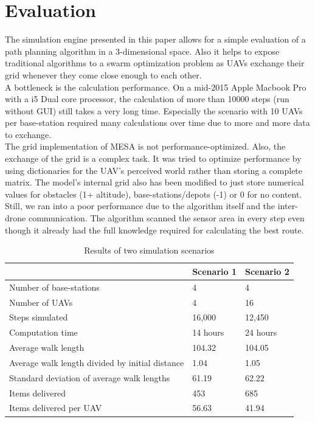 \section{Evaluation}\label{sec:evaluation}
The simulation engine presented in this paper allows for a simple evaluation of a path planning algorithm in a 3-dimensional space. Also it helps to expose traditional algorithms to a swarm optimization problem as UAVs exchange their grid whenever they come close enough to each other.\\
A bottleneck is the calculation performance. On a mid-2015 Apple Macbook Pro with a i5 Dual core processor, the calculation of more than 10000 steps (run without GUI) still takes a very long time. Especially the scenario with 10 UAVs per base-station required many calculations over time due to more and more data to exchange. \\
The grid implementation of MESA is not performance-optimized. Also, the exchange of the grid is a complex task. It was tried to optimize performance by using dictionaries for the UAV's perceived world rather than storing a complete matrix. The model's internal grid also has been modified to just store numerical values for obstacles (1+ altitude), base-stations/depots (-1) or 0 for no content.\\
Still, we ran into a poor performance due to the algorithm itself and the inter-drone communication. The algorithm scanned the sensor area in every step even though it already had the full knowledge required for calculating the best route.  \\
 \begin{table}[tbhp]\label{tab:results}
 	\centering

  \begin{tabular}{ | l | l | l |}
    \hline
     & \textbf{Scenario 1} 					& \textbf{Scenario 2 }				\\ \hline
    Number of base-stations 	& 4 								& 4 \\ \hline
    Number of UAVs 				& 4								& 16\\ \hline
    Steps simulated 				& 16,000 					& 12,450 \\ \hline
    Computation time 			& 14 hours 					& 24 hours \\ \hline
    Average walk length 		& 104.32 								& 104.05\\ \hline
    Average walk length divided by initial distance & 1.04 & 1.05 \\ \hline
    Standard deviation of average walk lengths & 61.19 & 62.22 \\ \hline
    Items delivered 				& 453							&  685\\ \hline
    Items delivered per UAV & 56.63 & 41.94 \\ \hline
    \hline
  \end{tabular}
	 	
  \caption{Results of two simulation scenarios}
 \end{table}
